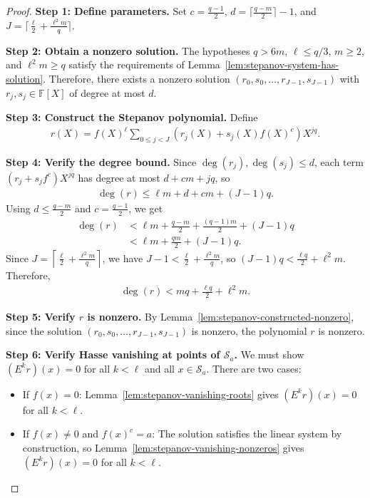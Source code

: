\begin{proof} \leanok
  \textbf{Step 1: Define parameters.} Set $c = \frac{q-1}{2}$, $d = \lceil\frac{q-m}{2}\rceil - 1$, and $J = \lceil\frac{\ell}{2} + \frac{\ell^2 m}{q}\rceil$.

  \textbf{Step 2: Obtain a nonzero solution.} The hypotheses $q > 6m$, $\ell \leq q/3$, $m \geq 2$, and $\ell^2 m \geq q$ satisfy the requirements of Lemma~\ref{lem:stepanov-system-has-solution}. Therefore, there exists a nonzero solution $(r_0, s_0, \ldots, r_{J-1}, s_{J-1})$ with $r_j, s_j \in \mathbb{F}[X]$ of degree at most $d$.

  \textbf{Step 3: Construct the Stepanov polynomial.} Define
  \begin{align*}
    r(X) = f(X)^\ell \sum_{0 \leq j < J} (r_j(X) + s_j(X) f(X)^c) X^{jq}.
  \end{align*}

  \textbf{Step 4: Verify the degree bound.} Since $\deg(r_j), \deg(s_j) \leq d$, each term $(r_j + s_j f^c)X^{jq}$ has degree at most $d + cm + jq$, so
  \begin{align*}
    \deg(r) \leq \ell m + d + cm + (J-1)q.
  \end{align*}
  Using $d \leq \frac{q-m}{2}$ and $c = \frac{q-1}{2}$, we get
  \begin{align*}
    \deg(r) & < \ell m + \frac{q-m}{2} + \frac{(q-1)m}{2} + (J-1)q \\
            & < \ell m + \frac{q m}{2} + (J-1)q.
  \end{align*}
  Since $J = \left\lceil \frac{\ell}{2} + \frac{\ell^2 m}{q} \right\rceil$, we have $J-1 < \frac{\ell}{2} + \frac{\ell^2 m}{q}$, so $(J-1)q < \frac{\ell q}{2} + \ell^2 m$. Therefore,
  \begin{align*}
    \deg(r) < mq + \frac{\ell q}{2} + \ell^2 m.
  \end{align*}

  \textbf{Step 5: Verify $r$ is nonzero.} By Lemma~\ref{lem:stepanov-constructed-nonzero}, since the solution $(r_0, s_0, \ldots, r_{J-1}, s_{J-1})$ is nonzero, the polynomial $r$ is nonzero.

  \textbf{Step 6: Verify Hasse vanishing at points of $\mathcal{S}_a$.} We must show $(E^k r)(x) = 0$ for all $k < \ell$ and all $x \in \mathcal{S}_a$. There are two cases:
  \begin{itemize}
    \item If $f(x) = 0$: Lemma~\ref{lem:stepanov-vanishing-roots} gives $(E^k r)(x) = 0$ for all $k < \ell$.
    \item If $f(x) \neq 0$ and $f(x)^c = a$: The solution satisfies the linear system by construction, so Lemma~\ref{lem:stepanov-vanishing-nonzeros} gives $(E^k r)(x) = 0$ for all $k < \ell$.
  \end{itemize}
\end{proof}

